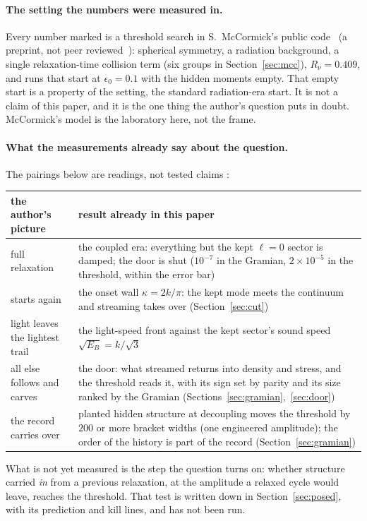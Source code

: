 \paragraph{The setting the numbers were measured in.} Every number marked  is a threshold search in S.~McCormick's public code~\cite{McCcode} (a preprint, not peer reviewed~\cite{McC}): spherical symmetry, a radiation background, a single relaxation-time collision term (six groups in Section~\ref{sec:mcc}), $R_\nu=0.409$, and runs that start at $\epsilon_0=0.1$ with the hidden moments empty. That empty start is a property of the setting, the standard radiation-era start. It is not a claim of this paper, and it is the one thing the author's question puts in doubt. McCormick's model is the laboratory here, not the frame.

\paragraph{What the measurements already say about the question.} The pairings below are readings, not tested claims :
\begin{center}\small\begin{tabular}{p{}p{}}\toprule
the author's picture & result already in this paper\\\midrule
full relaxation & the coupled era: everything but the kept $\ell=0$ sector is damped; the door is shut ($10^{-7}$ in the Gramian, $2\times10^{-5}$ in the threshold, within the error bar)\\
starts again & the onset wall $\kappa=2k/\pi$: the kept mode meets the continuum and streaming takes over (Section~\ref{sec:cut})\\
light leaves the lightest trail & the light-speed front against the kept sector's sound speed $\sqrt{E_B}=k/\sqrt3$\\
all else follows and carves & the door: what streamed returns into density and stress, and the threshold reads it, with its sign set by parity and its size ranked by the Gramian (Sections~\ref{sec:gramian},~\ref{sec:door})\\
the record carries over & planted hidden structure at decoupling moves the threshold by $200$ or more bracket widths (one engineered amplitude); the order of the history is part of the record (Section~\ref{sec:gramian})\\\bottomrule\end{tabular}\end{center}
What is not yet measured is the step the question turns on: whether structure carried \emph{in} from a previous relaxation, at the amplitude a relaxed cycle would leave, reaches the threshold. That test is written down in Section~\ref{sec:posed}, with its prediction and kill lines, and has not been run.

